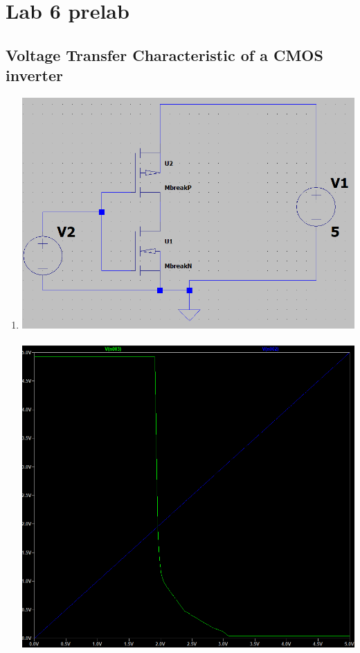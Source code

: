 \documentclass{article}
\begin{document}
	
	\section{Lab 6 prelab}
		\subsection{Voltage Transfer Characteristic of a CMOS inverter}
			\begin{enumerate}
				\item 
				 \includegraphics[scale=0.55]{prelab 6/2 circuit}\\\\
				\includegraphics[scale=0.55]{prelab 6/1 vtc}\\\\

\end{enumerate}
\end{document}
